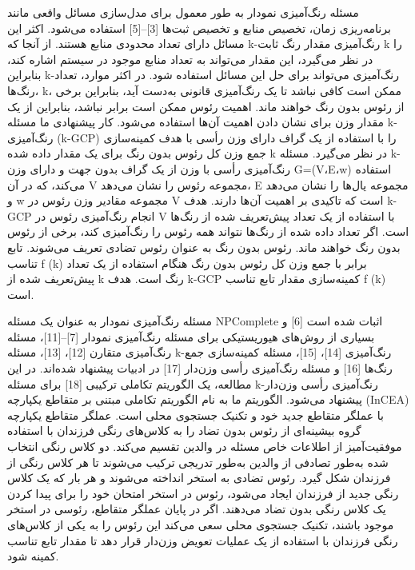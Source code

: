\documentclass[a4paper,10pt]{article}
\begin{document}
        مسئله رنگ‌آمیزی نمودار به طور معمول برای مدل‌سازی مسائل واقعی مانند برنامه‌ریزی زمان، تخصیص منابع و تخصیص ثبت‌ها [3]–[5] استفاده می‌شود. اکثر این مسائل دارای تعداد محدودی منابع هستند. از آنجا که k-رنگ‌آمیزی مقدار رنگ ثابت k را در نظر می‌گیرد، این مقدار می‌تواند به تعداد منابع موجود در سیستم اشاره کند، بنابراین k-رنگ‌آمیزی می‌تواند برای حل این مسائل استفاده شود. در اکثر موارد، تعداد رنگ‌ها، k، ممکن است کافی نباشد تا یک رنگ‌آمیزی قانونی به‌دست آید، بنابراین برخی از رئوس بدون رنگ خواهند ماند. اهمیت رئوس ممکن است برابر نباشد، بنابراین از یک مقدار وزن برای نشان دادن اهمیت آن‌ها استفاده می‌شود. کار پیشنهادی ما مسئله k-رنگ‌آمیزی (k-GCP) را با استفاده از یک گراف دارای وزن رأسی با هدف کمینه‌سازی جمع وزن کل رئوس بدون رنگ برای یک مقدار داده شده k در نظر می‌گیرد. مسئله k-رنگ‌آمیزی رأسی با وزن از یک گراف بدون جهت و دارای وزن G=(V،E،w) استفاده می‌کند، که در آن V مجموعه رئوس را نشان می‌دهد، E مجموعه یال‌ها را نشان می‌دهد و w مجموعه مقادیر وزن رئوس در V است که تاکیدی بر اهمیت آن‌ها دارند. هدف k-GCP انجام رنگ‌آمیزی رئوس در V با استفاده از یک تعداد پیش‌تعریف شده از رنگ‌ها است. اگر تعداد داده شده از رنگ‌ها نتواند همه رئوس را رنگ‌آمیزی کند، برخی از رئوس بدون رنگ خواهند ماند. رئوس بدون رنگ به عنوان رئوس تضادی تعریف می‌شوند. تابع تناسب f (k) برابر با جمع وزن کل رئوس بدون رنگ هنگام استفاده از یک تعداد پیش‌تعریف شده از k رنگ است. هدف k-GCP کمینه‌سازی مقدار تابع تناسب f (k) است.

        مسئله رنگ‌آمیزی نمودار به عنوان یک مسئله NPComplete اثبات شده است [6] و بسیاری از روش‌های هیوریستیکی برای مسئله رنگ‌آمیزی نمودار [7]–[11]، مسئله رنگ‌آمیزی متقارن [12]، [13]، مسئله k-رنگ‌آمیزی [14]، [15]، مسئله کمینه‌سازی جمع رنگ‌ها [16] و مسئله رنگ‌آمیزی رأسی وزن‌دار [17] در ادبیات پیشنهاد شده‌اند. در این مطالعه، یک الگوریتم تکاملی ترکیبی [18] برای مسئله k-رنگ‌آمیزی رأسی وزن‌دار پیشنهاد می‌شود. الگوریتم ما به نام الگوریتم تکاملی مبتنی بر متقاطع یکپارچه (InCEA) با عملگر متقاطع جدید خود و تکنیک جستجوی محلی است. عملگر متقاطع یکپارچه گروه بیشینه‌ای از رئوس بدون تضاد را به کلاس‌های رنگی فرزندان با استفاده موفقیت‌آمیز از اطلاعات خاص مسئله در والدین تقسیم می‌کند. دو کلاس رنگی انتخاب شده به‌طور تصادفی از والدین به‌طور تدریجی ترکیب می‌شوند تا هر کلاس رنگی از فرزندان شکل گیرد. رئوس تضادی به استخر انداخته می‌شوند و هر بار که یک کلاس رنگی جدید از فرزندان ایجاد می‌شود، رئوس در استخر امتحان خود را برای پیدا کردن یک کلاس رنگی بدون تضاد می‌دهند. اگر در پایان عملگر متقاطع، رئوسی در استخر موجود باشند، تکنیک جستجوی محلی سعی می‌کند این رئوس را به یکی از کلاس‌های رنگی فرزندان با استفاده از یک عملیات تعویض وزن‌دار قرار دهد تا مقدار تابع تناسب کمینه شود.
\end{document}
